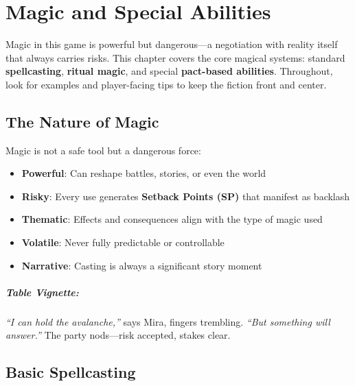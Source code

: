 
\chapter{Magic and Special Abilities} \label{ch:magic}

\begin{multicols}{2}

Magic in this game is powerful but dangerous—a negotiation with reality itself that always carries risks. This chapter covers the core magical systems: standard \textbf{spellcasting}, \textbf{ritual magic}, and special \textbf{pact-based abilities}. Throughout, look for examples and player-facing tips to keep the fiction front and center.

\section{The Nature of Magic} 

Magic is not a safe tool but a dangerous force:
\begin{itemize}
\item \textbf{Powerful}: Can reshape battles, stories, or even the world
\item \textbf{Risky}: Every use generates \textbf{Setback Points (SP)} that manifest as backlash
\item \textbf{Thematic}: Effects and consequences align with the type of magic used
\item \textbf{Volatile}: Never fully predictable or controllable
\item \textbf{Narrative}: Casting is always a significant story moment
\end{itemize}

\paragraph{Table Vignette:}
\emph{“I can hold the avalanche,”} says Mira, fingers trembling. \emph{“But something will answer.”} The party nods—risk accepted, stakes clear.

\section{Basic Spellcasting} 


\end{multicols}
